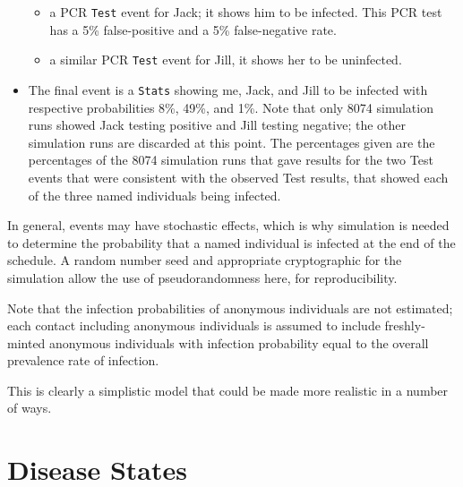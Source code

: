 \documentclass[11pt]{article}
\providecommand{\tightlist}{%
      \setlength{\itemsep}{0pt}\setlength{\parskip}{0pt}}
\begin{document}
\begin{itemize}
  \begin{itemize}
  \tightlist
  \item
    a PCR \texttt{Test} event for Jack; it shows him to be infected.
    This PCR test has a 5\% false-positive and a 5\% false-negative
    rate.
  \item
    a similar PCR \texttt{Test} event for Jill, it shows her to be
    uninfected.
  \end{itemize}
\item
  The final event is a \texttt{Stats} showing me, Jack, and Jill to be
  infected with respective probabilities 8\%, 49\%, and 1\%. Note that
  only 8074 simulation runs showed Jack testing positive and Jill
  testing negative; the other simulation runs are discarded at this
  point. The percentages given are the percentages of the 8074
  simulation runs that gave results for the two Test events that were
  consistent with the observed Test results, that showed each of the
  three named individuals being infected.
\end{itemize}

In general, events may have stochastic effects, which is why simulation
is needed to determine the probability that a named individual is
infected at the end of the schedule. A random number seed and
appropriate cryptographic for the simulation allow the use of
pseudorandomness here, for reproducibility.

Note that the infection probabilities of anonymous individuals are not
estimated; each contact including anonymous individuals is assumed to
include freshly-minted anonymous individuals with infection probability
equal to the overall prevalence rate of infection.

This is clearly a simplistic model that could be made more realistic in
a number of ways.
\newpage
    \hypertarget{disease-states}{%
\section{Disease States}\label{disease-states}}
\end{document}
